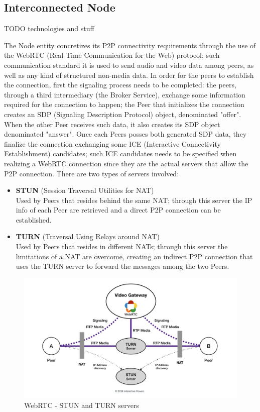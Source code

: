 \subsection{Interconnected Node}
TODO technologies and stuff

The Node entity concretizes its P2P connectivity requirements through the use of the WebRTC (Real-Time Communication for the Web) protocol; such communication standard it is used to send audio and video data among peers, as well as any kind of structured non-media data. In order for the peers to establish the connection, first the signaling process needs to be completed: the peers, through a third intermediary (the Broker Service), exchange some information required for the connection to happen; the Peer that initializes the connection creates an SDP (Signaling Description Protocol) object, denominated "offer". When the other Peer receives such data, it also creates its SDP object denominated "answer". Once each Peers posses both generated SDP data, they finalize the connection exchanging some ICE (Interactive Connectivity Establishment) candidates; such ICE candidates needs to be specified when realizing a WebRTC connection since they are the actual servers that allow the P2P connection. There are two types of servers involved:
\begin{itemize}
    \item \textbf{STUN} (Session Traversal Utilities for NAT)\\
    Used by Peers that resides behind the same NAT; through this server the IP info of each Peer are retrieved and a direct P2P connection can be established.
    \item \textbf{TURN} (Traversal Using Relays around NAT)\\
    Used by Peers that resides in different NATs; through this server the limitations of a NAT are overcome, creating an indirect P2P connection that uses the TURN server to forward the messages among the two Peers.
\end{itemize}

\begin{figure}[!ht]
    \centering
    \includegraphics[width=\linewidth]{document/chapters/chapter_7/images/webrtc.jpeg}
    \caption{WebRTC - STUN and TURN servers \cite{stun_and_turn_servers}}
    \label{fig:webrtc}
\end{figure}


